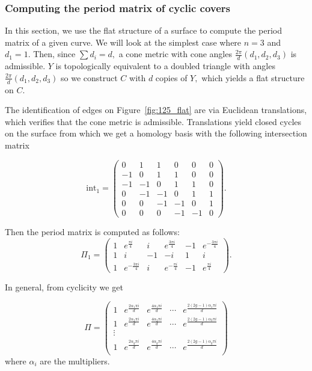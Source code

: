 \documentclass[12pt,reqno]{amsart}
\theoremstyle{definition}
\theoremstyle{remark}
\begin{document}
\subsubsection*{Computing the period matrix of cyclic covers}
\label{sec:cyclicperiod}
In this section, we use the flat structure of a surface to compute the period matrix of a given curve. We will look at the simplest case where $n = 3$ and $d_1 = 1.$ Then, since $\sum d_i = d,$ a cone metric with cone angles $\frac{2 \pi}{d}(d_1, d_2, d_3)$ is admissible. $Y$ is topologically equivalent to a doubled triangle with angles $\frac{2 \pi}{d}(d_1, d_2, d_3)$ so we construct $C$ with $d$ copies of $Y,$ which yields a flat structure on $C.$ 

The identification of edges on Figure~\ref{fig:125_flat} are via Euclidean translations, which verifies that the cone metric is admissible. Translations yield closed cycles on the surface from which we get a homology basis with the following intersection matrix

$$\textrm{int}_1 = \begin{pmatrix} 0 & 1 & 1 & 0 & 0 & 0 \\
 -1 & 0 & 1 & 1 & 0 & 0 \\
 -1 & -1 & 0 & 1 & 1 & 0 \\
 0 & -1 & -1 & 0 & 1 & 1 \\
 0 & 0 & -1 & -1 & 0 & 1 \\
 0 & 0 & 0 & -1 & -1 & 0 \end{pmatrix}.$$

Then the period matrix is computed as follows: 
$$\Pi_1 = \left(
\begin{array}{cccccc}
 1 & e^{\frac{\pi i}{4}} & i & e^{\frac{3 \pi i}{4}} & -1 & e^{-\frac{3 \pi i}{4}} \\
 1 & i & -1 & -i & 1 & i \\
 1 & e^{-\frac{3 \pi i}{4}} & i & e^{-\frac{\pi i}{4}} & -1 & e^{\frac{\pi i}{4}} 
\end{array}
\right).$$


In general, from cyclicity we get 

$$\Pi = \left(
\begin{array}{ccccc}
 1 & e^{\frac{2 \alpha_1 \pi i}{d}} & e^{\frac{4 \alpha_1 \pi i}{d}} & \cdots & e^{\frac{2 (2 g - 1) \alpha_1 \pi i}{d}} \\
 1 & e^{\frac{2 \alpha_2 \pi i}{d}} & e^{\frac{4 \alpha_2 \pi i}{d}} & \cdots & e^{\frac{2 (2 g - 1) \alpha_2 \pi i}{d}} \\
 \vdots\\
 1 & e^{\frac{2 \alpha_g \pi i}{d}} & e^{\frac{4 \alpha_g \pi i}{d}} & \cdots & e^{\frac{2 (2 g - 1) \alpha_g \pi i}{d}} \\
\end{array}
\right)$$
where $\alpha_i$ are the multipliers.
\end{document}
